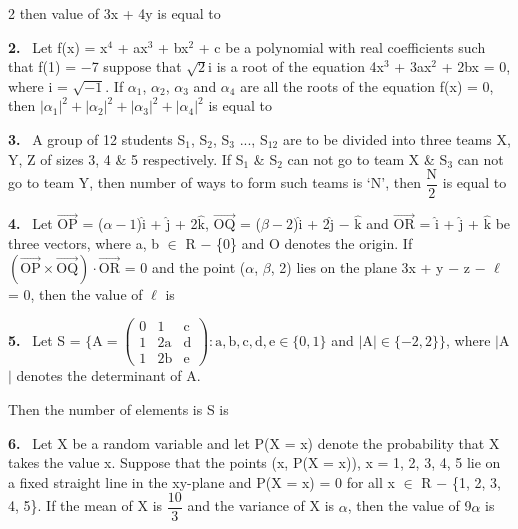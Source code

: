 \documentclass[10pt]{extarticle}
\newcommand{\qn}[1]{\par\smallskip\noindent\textbf{#1.}~}
\begin{document}
\begin{multicols}{2}
then value of 3x + 4y is equal to \underline{\hspace{1.5cm}}
\qn{2} Let f(x) = x$^4$ + ax$^3$ + bx$^2$ + c be a polynomial with real coefficients such that f(1) = $-$7 suppose that $\sqrt2$i is a root of the equation 4x$^3$ + 3ax$^2$ + 2bx = 0, where i = $\sqrt{-1}$. If $\alpha_1$, $\alpha_2$, $\alpha_3$ and $\alpha_4$ are all the roots of the equation f(x) = 0, then $|\alpha_1|^2+|\alpha_2|^2+|\alpha_3|^2+|\alpha_4|^2$ is equal to \underline{\hspace{1.5cm}}
\qn{3} A group of 12 students S$_1$, S$_2$, S$_3$ ..., S$_{12}$ are to be divided into three teams X, Y, Z of sizes 3, 4 \& 5 respectively. If S$_1$ \& S$_2$ can not go to team X \& S$_3$ can not go to team Y, then number of ways to form such teams is `N', then $\dfrac{\mathrm N}2$ is equal to \underline{\hspace{1.5cm}}
\qn{4} Let $\overrightarrow{\mathrm{OP}}$ = ($\alpha-1$)$\hat{\mathrm i}$ + $\hat{\mathrm j}$ + 2$\hat{\mathrm k}$, $\overrightarrow{\mathrm{OQ}}$ = ($\beta-2$)$\hat{\mathrm i}$ + 2$\hat{\mathrm j}$ $-$ $\hat{\mathrm k}$ and $\overrightarrow{\mathrm{OR}}$ = $\hat{\mathrm i}$ + $\hat{\mathrm j}$ + $\hat{\mathrm k}$ be three vectors, where a, b $\in$ R $-$ \{0\} and O denotes the origin. If $\left(\overrightarrow{\mathrm{OP}}\times\overrightarrow{\mathrm{OQ}}\right)\cdot\overrightarrow{\mathrm{OR}}$ = 0 and the point ($\alpha$, $\beta$, 2) lies on the plane 3x + y $-$ z $-$ $\ell$ = 0, then the value of $\ell$ is \underline{\hspace{1.5cm}}
\qn{5} Let S = $\bigl\{\mathrm A=\begin{pmatrix}0&1&\mathrm c\\1&2\mathrm a&\mathrm d\\1&2\mathrm b&\mathrm e\end{pmatrix}:\mathrm a,\mathrm b,\mathrm c,\mathrm d,\mathrm e\in\{0,1\}$ and $|\mathrm A|\in\{-2,2\}\bigr\}$, where $|$A$|$ denotes the determinant of A.\par
Then the number of elements is S is \underline{\hspace{1.5cm}}
\qn{6} Let X be a random variable and let P(X = x) denote the probability that X takes the value x. Suppose that the points (x, P(X = x)), x = 1, 2, 3, 4, 5 lie on a fixed straight line in the xy-plane and P(X = x) = 0 for all x $\in$ R $-$ \{1, 2, 3, 4, 5\}. If the mean of X is $\dfrac{10}3$ and the variance of X is $\alpha$, then the value of 9$\alpha$ is \underline{\hspace{1.5cm}}
\raggedcolumns

\end{multicols}
\end{document}
